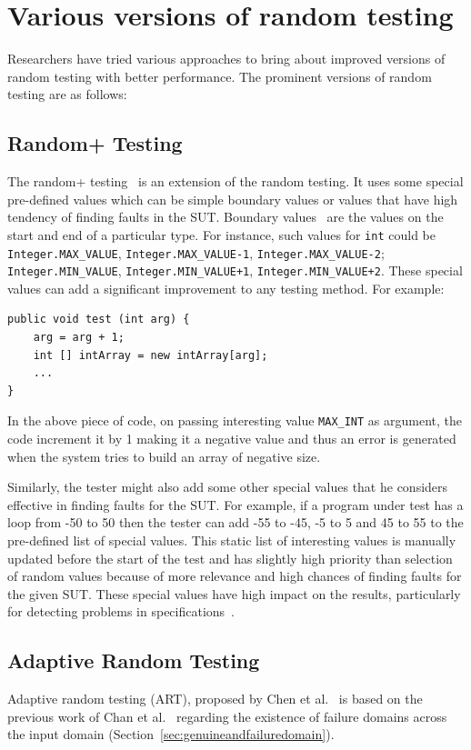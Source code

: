 \section{Various versions of random testing}
Researchers have tried various approaches to bring about improved versions of random testing with better performance. The prominent versions of random testing are as follows:

\subsection{Random+ Testing}
The random+ testing~\cite{leitner2007reconciling} is an extension of the random testing. It uses some special pre-defined values which can be simple boundary values or values that have high tendency of finding faults in the SUT. Boundary values~\cite{beizer2003software} are the values on the start and end of a particular type. For instance, such values for \verb+int+ could be \verb+Integer.MAX_VALUE+, \verb+Integer.MAX_VALUE-1+, \verb+Integer.MAX_VALUE-2+; \verb+Integer.MIN_VALUE+, \verb-Integer.MIN_VALUE+1-, \verb-Integer.MIN_VALUE+2-. These special values can add a significant improvement to any testing method. For example:

\begin{lstlisting}
public void test (int arg) {
	arg = arg + 1;
	int [] intArray = new intArray[arg];
	...
}
\end{lstlisting}

In the above piece of code, on passing interesting value \verb+MAX_INT+ as argument, the code increment it by 1 making it a negative value and thus an error is generated when the system tries to build an array of negative size. 

Similarly, the tester might also add some other special values that he considers effective in finding faults for the SUT. For example, if a program under test has a loop from -50 to 50 then the tester can add -55 to -45, -5 to 5 and 45 to 55 to the pre-defined list of special values. This static list of interesting values is manually updated before the start of the test and has slightly high priority than selection of random values because of more relevance and high chances of finding faults for the given SUT. These special values have high impact on the results, particularly for detecting problems in specifications~\cite{ciupa2008finding}.


\subsection{Adaptive Random Testing}
\label{sec:artpatterns_2}
Adaptive random testing (ART), proposed by Chen et al.~\cite{chen2005adaptive} is based on the previous work of Chan et al.~\cite{chan1996proportional} regarding the existence of failure domains across the input domain (Section~\ref{sec:genuineandfailuredomain}).

